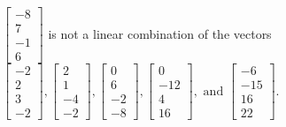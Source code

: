 \begin{exercise}
\begin{exerciseStatement}
  \end{exerciseStatement}
  \begin{exerciseAnswer}
   \(\left[\begin{array}{c}
-8 \\
7 \\
-1 \\
6
\end{array}\right]\) 
  	 is not  
	a linear combination of the vectors \(\left[\begin{array}{c}
-2 \\
2 \\
3 \\
-2
\end{array}\right] , \left[\begin{array}{c}
2 \\
1 \\
-4 \\
-2
\end{array}\right] , \left[\begin{array}{c}
0 \\
6 \\
-2 \\
-8
\end{array}\right] , \left[\begin{array}{c}
0 \\
-12 \\
4 \\
16
\end{array}\right] , \text{ and } \left[\begin{array}{c}
-6 \\
-15 \\
16 \\
22
\end{array}\right]\).

	
  


  \end{exerciseAnswer}
\end{exercise}